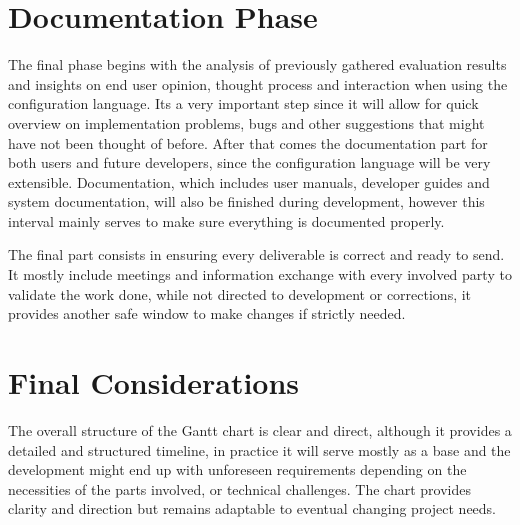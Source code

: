\section{Documentation Phase}
\label{sec:dev_plan_doc}

The final phase begins with the analysis of previously gathered evaluation results and insights on end user opinion, thought process and interaction when using the configuration language. Its a very important step since it will allow for quick overview on implementation problems, bugs and other suggestions that might have not been thought of before. After that comes the documentation part for both users and future developers, since the configuration language will be very extensible. Documentation, which includes user manuals, developer guides and system documentation, will also be finished during development, however this interval mainly serves to make sure everything is documented properly.

The final part consists in ensuring every deliverable is correct and ready to send. It mostly include meetings and information exchange with every involved party to validate the work done, while not directed to development or corrections, it provides another safe window to make changes if strictly needed.

\section{Final Considerations}
\label{sec:dev_plan_final}

The overall structure of the Gantt chart is clear and direct, although it provides a detailed and structured timeline, in practice it will serve mostly as a base and the development might end up with unforeseen requirements depending on the necessities of the parts involved, or technical challenges. The chart provides clarity and direction but remains adaptable to eventual changing project needs.
